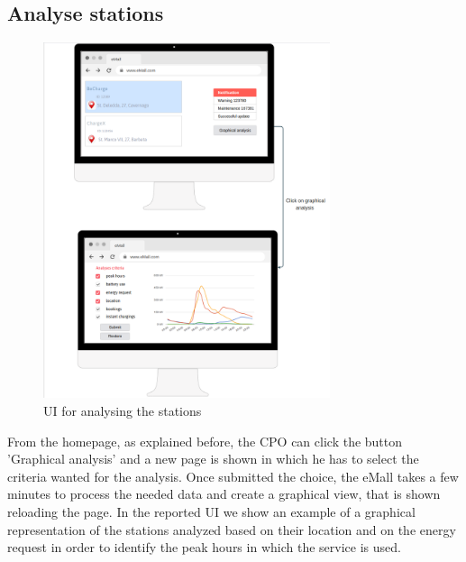 \subsection{Analyse stations}
\begin{figure}[H]
    \centering
    \includegraphics[trim={0.5cm 0cm 0cm 0.2cm},clip,width=0.75\textwidth]{Images/cp3/stationAnalysis.png}
    \caption{UI for analysing the stations}
\end{figure}
From the homepage, as explained before, the CPO can click the button 'Graphical analysis' and a new page is shown in which he has to select the criteria wanted for the analysis. Once submitted the choice, the eMall takes a few minutes to process the needed data and create a graphical view, that is shown reloading the page. In the reported UI we show an example of a graphical representation of the stations analyzed based on their location and on the energy request in order to identify the peak hours in which the service is used.  
\clearpage